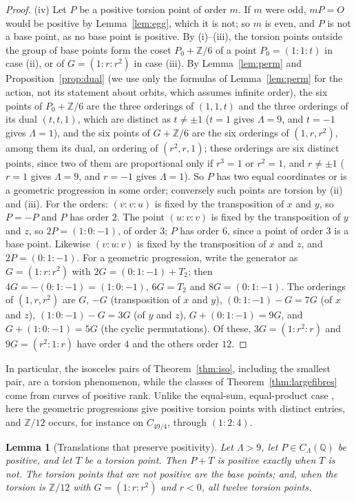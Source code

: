 \documentclass[11pt]{amsart}
\newtheorem{lemma}[theorem]{Lemma}
\theoremstyle{definition}
\theoremstyle{remark}
\newcommand{\Q}{\mathbb{Q}}
\newcommand{\Z}{\mathbb{Z}}
\begin{document}
\begin{proof}
(iv) Let $P$ be a positive torsion point of order $m$. If $m$ were odd, $mP=O$ would be positive by Lemma~\ref{lem:egg}, which it is not; so $m$ is even, and $P$ is not a base point, as no base point is positive. By (i)--(iii), the torsion points outside the group of base points form the coset $P_0+\Z/6$ of a point $P_0=(1:1:t)$ in case (ii), or of $G=(1:r:r^2)$ in case (iii). By Lemma~\ref{lem:perm} and Proposition~\ref{prop:dual} (we use only the formulas of Lemma~\ref{lem:perm} for the action, not its statement about orbits, which assumes infinite order), the six points of $P_0+\Z/6$ are the three orderings of $(1,1,t)$ and the three orderings of its dual $(t,t,1)$, which are distinct as $t\ne\pm1$ ($t=1$ gives $\Lambda=9$, and $t=-1$ gives $\Lambda=1$), and the six points of $G+\Z/6$ are the six orderings of $(1,r,r^2)$, among them its dual, an ordering of $(r^2,r,1)$; these orderings are six distinct points, since two of them are proportional only if $r^3=1$ or $r^2=1$, and $r\ne\pm1$ ($r=1$ gives $\Lambda=9$, and $r=-1$ gives $\Lambda=1$). So $P$ has two equal coordinates or is a geometric progression in some order; conversely such points are torsion by (ii) and (iii). For the orders: $(v:v:u)$ is fixed by the transposition of $x$ and $y$, so $P=-P$ and $P$ has order $2$. The point $(u:v:v)$ is fixed by the transposition of $y$ and $z$, so $2P=(1:0:-1)$, of order $3$; $P$ has order $6$, since a point of order $3$ is a base point. Likewise $(v:u:v)$ is fixed by the transposition of $x$ and $z$, and $2P=(0:1:-1)$. For a geometric progression, write the generator as $G=(1:r:r^2)$ with $2G=(0:1:-1)+T_2$; then $4G=-(0:1:-1)=(1:0:-1)$, $6G=T_2$ and $8G=(0:1:-1)$. The orderings of $(1,r,r^2)$ are $G$, $-G$ (transposition of $x$ and $y$), $(0:1:-1)-G=7G$ (of $x$ and $z$), $(1:0:-1)-G=3G$ (of $y$ and $z$), $G+(0:1:-1)=9G$, and $G+(1:0:-1)=5G$ (the cyclic permutations). Of these, $3G=(1:r^2:r)$ and $9G=(r^2:1:r)$ have order $4$ and the others order $12$.
\end{proof}

In particular, the isosceles pairs of Theorem~\ref{thm:iso}, including the smallest pair, are a torsion phenomenon, while the classes of Theorem~\ref{thm:largefibres} come from curves of positive rank. Unlike the equal-sum, equal-product case \cite[Prop.~2.7, Thm~2.8]{sadekelsissi2015}, here the geometric progressions give positive torsion points with distinct entries, and $\Z/12$ occurs, for instance on $C_{49/4}$, through $(1:2:4)$.

\begin{lemma}[Translations that preserve positivity]\label{lem:postrans}
Let $\Lambda>9$, let $P\in C_\Lambda(\Q)$ be positive, and let $T$ be a torsion point. Then $P+T$ is positive exactly when $T$ is not. The torsion points that are not positive are the base points; and, when the torsion is $\Z/12$ with $G=(1:r:r^2)$ and $r<0$, all twelve torsion points.
\end{lemma}
\end{document}
